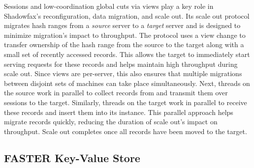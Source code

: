 Sessions and low-coordination global cuts via views play a key role in
Shadowfax's reconfiguration, data migration, and scale out.
%
Its scale out protocol migrates hash ranges from a \emph{source} server
to a \emph{target} server and is designed to minimize migration's
impact to throughput.
%
The protocol uses a view change to transfer ownership of the hash range
from the source to the target along with a small set of recently accessed
records.
%
This allows the target to immediately start serving requests for these
records and helps maintain high throughput during scale out.
%
Since views are per-server, this also ensures that multiple migrations
between disjoint sets of machines can take place simultaneously.
%
Next,
threads on the source work in parallel to collect records from \faster
and transmit them over sessions to the target.
%
Similarly, threads on the target work in parallel to receive these
records and insert them into its \faster instance.
%
This parallel approach helps migrate records quickly, reducing the
duration of scale out's impact on throughput.
%
Scale out completes once all records have been moved to the target.

\iffalse
\subsection{FASTER Key-Value Store}

